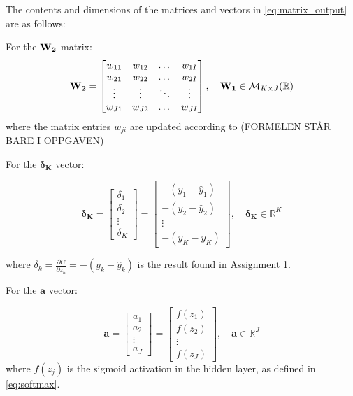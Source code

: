 \documentclass{article}
\begin{document}
The contents and dimensions of the matrices and vectors in \eqref{eq:matrix_output} are as follows: 


For the $\text{\textbf{W}}_\textbf{2}$ matrix:
\begin{equation}
    \text{\textbf{W}}_\textbf{2} =
    \begin{bmatrix}
        w_{11} & w_{12}& \dots & w_{1I} \\
         w_{21} & w_{22}& \dots & w_{2I} \\
        \vdots & \vdots & \ddots & \vdots \\
         w_{J1} & w_{J2}& \dots & w_{JI} \\
    \end{bmatrix}
    , \quad \text{\textbf{W}}_\textbf{1} \in \mathcal{M}_{K \times J}(\mathbb{R})
\end{equation}
where the matrix entries $w_{ji}$ are updated according to (FORMELEN STÅR BARE I OPPGAVEN)



For the $\boldsymbol{\delta_K}$ vector:

\begin{equation}
    \boldsymbol{\delta_K} = 
    \begin{bmatrix}
        \delta_1 \\
        \delta_2 \\
        \vdots \\
        \delta_K
    \end{bmatrix}
    = \begin{bmatrix}
        -(y_1 - \hat{y}_1) \\
        -(y_2 - \hat{y}_2)\\
        \vdots \\
        -(y_K - \hat{y}_K)
    \end{bmatrix}
    , \quad \boldsymbol{\delta_K} \in \mathbb{R}^K
\end{equation}

where $\delta_k = \frac{\partial C}{\partial z_k} = -(y_k - \hat{y}_k)$ is the result found in Assignment 1.

For the $\boldsymbol{a}$ vector:

\begin{equation}
    \boldsymbol{a} = \begin{bmatrix}
        a_1 \\
        a_2 \\
        \vdots \\
        a_J
    \end{bmatrix}
    =
    \begin{bmatrix}
        f(z_1) \\
        f(z_2) \\
        \vdots \\
        f(z_J)
    \end{bmatrix},
    \quad \boldsymbol{a} \in \mathbb{R}^J
\end{equation}
where $f(z_j)$ is the sigmoid activation in the hidden layer, as defined in \eqref{eq:softmax}.
\end{document}
